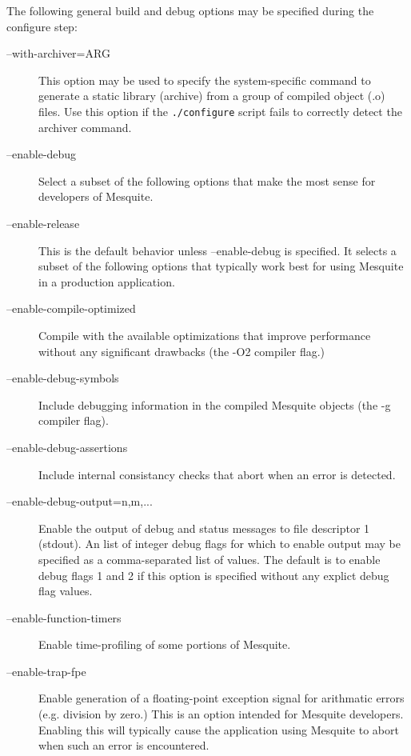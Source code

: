 \label{config_options}
The following general build and debug options may be specified during the configure step:
\begin{description}
\item[--with-archiver=ARG]  This option may be used to specify the
system-specific command to generate a static library (archive) from a group
of compiled object (.o) files.  Use this option if the \texttt{./configure} script fails to correctly detect the archiver command.
\item[--enable-debug]  Select a subset of the following options that
make the most sense for developers of Mesquite.
\item[--enable-release]  This is the default behavior unless 
--enable-debug is specified.  It selects a subset of the following options that
typically work best for using Mesquite in a production application.
\item[--enable-compile-optimized] Compile with the available 
optimizations that improve performance without any significant drawbacks 
(the -O2 compiler flag.)
\item[--enable-debug-symbols] Include debugging information in
the compiled Mesquite objects (the -g compiler flag).
\item[--enable-debug-assertions]  Include internal consistancy 
checks that abort when an error is detected.
\item[--enable-debug-output=n,m,...]  Enable the output of
debug and status messages to file descriptor 1 (stdout).  An 
list of integer debug flags for which to enable output may be specified 
as a comma-separated list of values.  The default is to enable debug
flags 1 and 2 if this option is specified without any explict debug
flag values.
\item[--enable-function-timers]  Enable time-profiling of
some portions of Mesquite.
\item[--enable-trap-fpe]  Enable generation of a floating-point
exception signal for arithmatic errors (e.g. division by zero.)  This is
an option intended for Mesquite developers.  Enabling this will typically cause
the application using Mesquite to abort when such an error is encountered.
\end{description}

